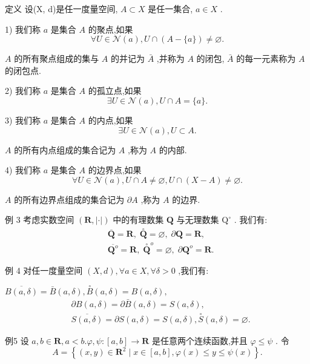 定义 设(X, d)是任一度量空间, $A \subset  X$ 是任一集合, $a \in  X$ .

1) 我们称 $a$ 是集合 $A$ 的聚点,如果
$$\forall U \in  \mathcal{N}\left( a\right) ,U \cap  \left( {A-\{ a\} }\right)  \neq  \varnothing .$$

$A$ 的所有聚点组成的集与 $A$ 的并记为 $\bar{A}$ ,并称为 $A$ 的闭包, $\bar{A}$ 的每一元素称为 $A$ 的闭包点.

2) 我们称 $a$ 是集合 $A$ 的孤立点,如果
$$\exists U \in  \mathcal{N}\left( a\right) ,U \cap  A = \{ a\} .$$

3) 我们称 $a$ 是集合 $A$ 的内点,如果
$$\exists U \in  \mathcal{N}\left( a\right) ,U \subset  A.$$

$A$ 的所有内点组成的集合记为 $A$ ,称为 $A$ 的内部.

4) 我们称 $a$ 是集合 $A$ 的边界点,如果
$$\forall U \in  \mathcal{N}\left( a\right) ,U \cap  A \neq  \varnothing ,U \cap  \left( {X - A}\right)  \neq  \varnothing .$$

$A$ 的所有边界点组成的集合记为 $\partial A$ ,称为 $A$ 的边界.

例 3 考虑实数空间 $\left( {\mathbf{R},\left| \cdot \right| }\right)$ 中的有理数集 $\mathbf{Q}$ 与无理数集 ${\mathrm{Q}}^{ \circ  }$ . 我们有:
\begin{align*}
	&\overline{\mathbf{Q}} = \mathbf{R},\;\overset{ \circ  }{\mathbf{Q}} = \varnothing ,\;\partial \mathbf{Q} = \mathbf{R},\\
	&\overline{{\mathbf{Q}}^{o}} = \mathbf{R},\;{\overset{ \circ  }{\mathbf{Q}}}^{o} = \varnothing ,\;\partial {\mathbf{Q}}^{o} = \mathbf{R}.
\end{align*}

例 4 对任一度量空间 $\left( {X,d}\right) ,\forall a \in  X,\forall \delta  > 0$ ,我们有:

$\overline{B\left( {a,\delta }\right) } = \bar{B}\left( {a,\delta }\right) ,\overset{ \circ  }{B}\left( {a,\delta }\right)  = B\left( {a,\delta }\right) ,$
\begin{align*}
	&\partial B\left( {a,\delta }\right)  = \partial \bar{B}\left( {a,\delta }\right)  = S\left( {a,\delta }\right) ,\\
	&\overline{S\left( {a,\delta }\right) } = \partial S\left( {a,\delta }\right)  = S\left( {a,\delta }\right) ,\overset{ \circ  }{S}\left( {a,\delta }\right)  = \varnothing .
\end{align*}

例5 设 $a,b \in  \mathbf{R},a < b.\varphi ,\psi  : \left\lbrack  {a,b}\right\rbrack   \rightarrow  \mathbf{R}$ 是任意两个连续函数,并且 $\varphi  \leq  \psi$ . 令
$$A = \left\{  {\left( {x,y}\right)  \in  {\mathbf{R}}^{2} \mid  x \in  \left\lbrack  {a,b}\right\rbrack  ,\varphi \left( x\right)  \leq  y \leq  \psi \left( x\right) }\right\}  .$$

